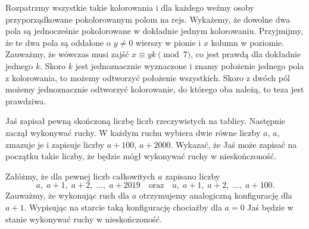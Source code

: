 \begin{center}
\end{center}

\noindent
Rozpatrzmy wszystkie takie kolorowania i dla każdego weźmy osoby przyporządkowane pokolorowanym polom na rejs. Wykażemy, że dowolne dwa pola są jednocześnie pokolorowane w dokładnie jednym kolorowaniu. Przyjmijmy, że te dwa pola są oddalone o $y \neq 0$ wierszy w pionie i $x$ kolumn w poziomie. Zauważmy, że wówczas musi zajść ${x \equiv yk \pmod{7}}$, co jest prawdą dla dokładnie jednego $k$. Skoro $k$ jest jednoznacznie wyznaczone i znamy położenie jednego pola z kolorowania, to możemy odtworzyć położenie wszystkich. Skoro z dwóch pól możemy jednoznacznie odtworzyć kolorowanie, do którego oba należą, to teza jest prawdziwa.

\vspace{10px}

\begin{problem}{6}
	Jaś zapisał pewną skończoną liczbę liczb rzeczywistych na tablicy. Następnie zaczął wykonywać ruchy. W każdym ruchu wybiera dwie równe liczby $a$, $a$, zmazuje je i zapisuje liczby $a + 100$, $a + 2000$. Wykazać, że Jaś może zapisać na początku takie liczby, że będzie mógł wykonywać ruchy w nieskończoność.
\end{problem}

\noindent
Załóżmy, że dla pewnej liczb całkowitych $a$ zapisano liczby
\[
	a,\; a + 1,\; a + 2,\; ...,\; a + 2019 \quad \text{oraz} \quad
	a,\; a + 1,\; a + 2,\; ..., \; a + 100.
\]
Zauważmy, że wykonując ruch dla $a$ otrzymujemy analogiczną konfigurację dla $a + 1$. Wypisując na starcie taką konfigurację chociażby dla $a = 0$ Jaś będzie w stanie wykonywać ruchy w nieskończoność.



